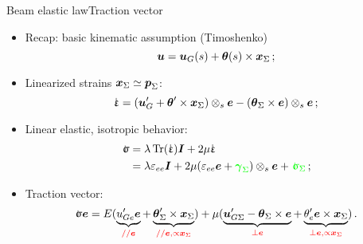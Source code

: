 \begin{frame}{Beam elastic law}{Traction vector}

\begin{itemize}
\item Recap: basic kinematic assumption (Timoshenko)
\begin{displaymath}
{\boldsymbol{u}}={\boldsymbol{u}}_G(s)+{\boldsymbol{\theta}}(s)\times{\boldsymbol{x}}_\Sigma\,;
\end{displaymath}
\item Linearized strains ${\boldsymbol{x}}_\Sigma\simeq{\boldsymbol{p}}_\Sigma$:
\begin{displaymath}
\strain=(\uv_G'+\drot'\times\xv_\Sigma)\otimes_s\ev-(\drot_\Sigma\times\ev)\otimes_s\ev\,;
\end{displaymath}
\item Linear elastic, isotropic behavior:
\begin{displaymath}
\begin{split}
\stress &=\lambda\trace(\strain)\Id+2\mu\strain \\
&=\lambda\strainj_{ee}\Id+2\mu(\strainj_{ee}\ev+{\color{green}{{\boldsymbol\gamma}_\Sigma}})\otimes_s\ev+{\color{green}{\stress_\Sigma}}\,;
\end{split}
\end{displaymath}
\item Traction vector:
\begin{displaymath}
\stress\ev=E(\underbrace{\uj_{Ge}'\ev}_{\color{red}{//\ev}}+\underbrace{\drot_\Sigma'\times\xv_\Sigma}_{\color{red}{//\ev,\propto\xv_\Sigma}})+\mu(\underbrace{\uv_{G\Sigma}'-\drot_\Sigma\times\ev}_{\color{red}{\perp\ev}}+\underbrace{\drotj_e'\ev\times\xv_\Sigma}_{\color{red}{\perp\ev,\propto\xv_\Sigma}})\,.
\end{displaymath}
\end{itemize}

\end{frame}

